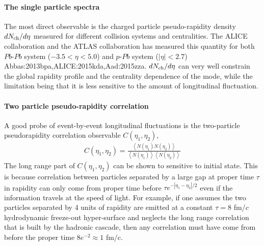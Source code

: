 \paragraph{The single particle spectra}
The most direct observable is the charged particle pseudo-rapidity density $dN_\text{ch}/d\eta$ measured for different collision systems and centralities.
The ALICE collaboration and the ATLAS collaboration has measured this quantity for both $Pb$-$Pb$ system ($-3.5<\eta<5.0$) and $p$-$Pb$ system ($|\eta| < 2.7$) {Abbas:2013bpa,ALICE:2015kda,Aad:2015zza}.
$dN_\text{ch}/d\eta$ can very well constrain the global rapidity profile and the centrality dependence of the mode, while the limitation being that it is less sensitive to the amount of longitudinal fluctuation.

\paragraph{Two particle pseudo-rapidity correlation}
A good probe of event-by-event longitudinal fluctuations is the two-particle pseudorapidity correlation observable $C(\eta_1, \eta_2)$,
\begin{eqnarray}
C(\eta_1, \eta_2) = \frac{ \left\langle N(\eta_1)N(\eta_2) \right\rangle}{\left\langle N(\eta_1)\right\rangle\left\langle N(\eta_2) \right\rangle}
\end{eqnarray}
The long range part of $C(\eta_1, \eta_2)$ can be shown to sensitive to initial state.
This is because correlation between particles separated by a large gap at proper time $\tau$ in rapidity can only come from proper time before $\tau e^{-|\eta_1-\eta_2|/2}$ even if the information travels at the speed of light.
For example, if one assumes the two particles separated by 4 units of rapidity are emitted at a constant $\tau = 8$ fm/$c$ hydrodynamic freeze-out hyper-surface and neglects the long range correlation that is built by the hadronic cascade, then any correlation must have come from before the proper time $ 8 e^{-2}\approx 1$ fm/c.

